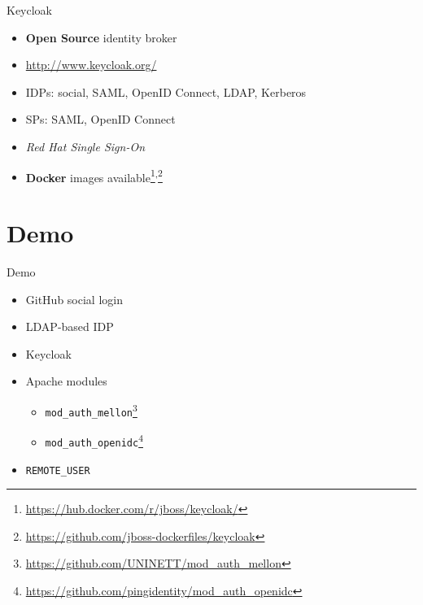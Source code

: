 \documentclass[ignorenonframetext,aspectratio=169]{beamer}
\providecommand{\tightlist}{%
  \setlength{\itemsep}{0pt}\setlength{\parskip}{0pt}}
\begin{document}
\begin{frame}{Keycloak}

\begin{itemize}
\tightlist
\item {\bf Open Source} identity broker
\item \url{http://www.keycloak.org/}
\item IDPs: social, SAML, OpenID Connect, LDAP, Kerberos
\item SPs: SAML, OpenID Connect
\item {\em Red Hat Single Sign-On}
\item {\bf Docker} images available\footnote{
        \url{https://hub.docker.com/r/jboss/keycloak/}
    }\textsuperscript{,}\footnote{
        \url{https://github.com/jboss-dockerfiles/keycloak}
    }
\end{itemize}
\end{frame}

\section{Demo}

\begin{frame}{Demo}
\begin{itemize}
\item GitHub social login
\item LDAP-based IDP
\item Keycloak
\item Apache modules
    \begin{itemize}
    \item {\tt mod\_auth\_mellon}\footnote{\url{https://github.com/UNINETT/mod_auth_mellon}}
    \item {\tt mod\_auth\_openidc}\footnote{\url{https://github.com/pingidentity/mod_auth_openidc}}
    \end{itemize}
\item {\tt REMOTE\_USER}
\end{itemize}
\end{frame}

\begin{frame}[plain]
\centering
{}
\end{frame}
\end{document}
